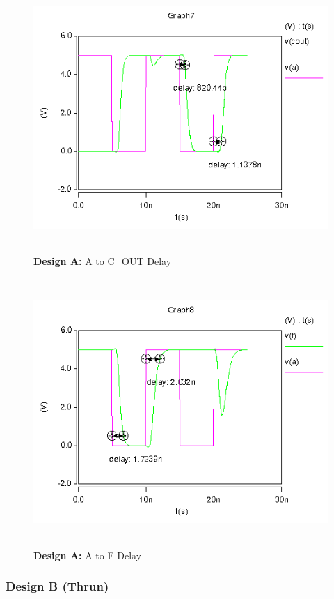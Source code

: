 \documentclass{article}
\begin{document}
\begin{figure}[H]
    \centering
    \includegraphics[height=4in]{../part_3/xiaohui/va_cout_delay_inv.png}
    \caption{\textbf{Design A:} A to C\_OUT Delay}
\end{figure}

\begin{figure}[H]
    \centering
    \includegraphics[height=4in]{../part_3/xiaohui/va_vf_delay_inv.png}
    \caption{\textbf{Design A:} A to F Delay}
\end{figure}

\newpage
\subsubsection*{Design B (Thrun)}
\end{document}
